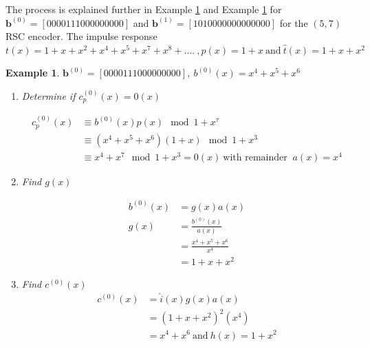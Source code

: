\documentclass[conference]{IEEEtran}
\newtheorem{example}[theorem]{Example}
\begin{document}
 The process is explained further in Example  \ref{ex1}  and Example  \ref{ex1} for $\textbf{b}^{(0)}=[ 0 0 0 0 1 1 1 0 0 0 0 0 0 0 0 0]$ and  $\textbf{b}^{(1)}=[ 1 0 1 0 0 0 0 0 0 0 0 0 0 0 0 0 ]$ for the $(5,7)$ RSC encoder. The impulse response $t(x)=1+x+x^2+x^4+x^5+x^7+x^8+....~,p(x)=1+x ~ \text{and} ~ \hat{t}(x)=1+x+x^2$
 
\begin{example}
\label{ex1}
$\textbf{b}^{(0)}=[ 0 0 0 0 1 1 1 0 0 0 0 0 0 0 0 0],~b^{(0)}(x)=x^4+x^5+x^6$

\begin{enumerate}
\item Determine if $c_p^{(0)}(x) =0(x)$

\begin{equation*}
\begin{split}
c_p^{(0)}(x)& \equiv b^{(0)}(x)p(x) \mod{1+x^{\tau}}\\
& \equiv (x^4+x^5+x^6)(1+x)  \mod{1+x^{3}}\\
&\equiv x^4+x^7  \mod{1+x^{3}} =0(x) ~\text{with remainder }~ a(x) =x^4
\end{split}
\end{equation*}

\item Find $g(x)$
 
 \begin{equation*}
 \begin{split}
 b^{(0)}(x)&=g(x)a(x) \\
 g(x) &=\frac{b^{(0)}(x)}{a(x)}\\
 &=\frac{x^4+x^5+x^6}{x^4}\\
 &=1+x+x^2
 \end{split}
 \end{equation*}
 
 \item Find $c^{(0)}(x)$
 \begin{equation*}
 \begin{split}
 c^{(0)}(x)&=\hat{i}(x)g(x)a(x) \\
 &=(1+x+x^2)^2(x^4)\\
 &=x^4+x^6 ~\text{and}~ h(x)=1+x^2 
 \end{split}
 \end{equation*}
 
\end{enumerate}
\end{example}
\end{document}
